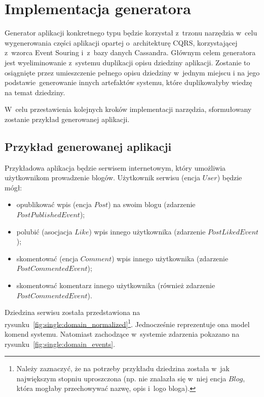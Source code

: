 \chapter{Implementacja generatora} \label{chap:implementation:single_type}

Generator aplikacji konkretnego typu będzie korzystał z~trzonu narzędzia w~celu wygenerowania części aplikacji opartej o~architekturę CQRS, korzystającej z~wzorca Event Souring i~z~bazy danych Cassandra.
Głównym celem generatora jest wyeliminowanie z~systemu duplikacji opisu dziedziny aplikacji.
Zostanie to osiągnięte przez umieszczenie pełnego opisu dziedziny w~jednym miejscu i na jego podstawie~generowanie innych artefaktów systemu, które duplikowałyby wiedzę na temat dziedziny.

W~celu przestawienia kolejnych kroków implementacji narzędzia, sformułowany zostanie przykład generowanej aplikacji.



\section{Przykład generowanej aplikacji}

Przykładowa aplikacja będzie serwisem internetowym, który umożliwia użytkownikom prowadzenie blogów.
Użytkownik serwisu (encja $User$) będzie mógł:

\begin{itemize}
 \item opublikować wpis (encja $Post$) na swoim blogu (zdarzenie $PostPublishedEvent$);
 \item polubić (asocjacja $Like$) wpis innego użytkownika (zdarzenie $PostLikedEvent$);
 \item skomentować (encja $Comment$) wpis innego użytkownika (zdarzenie $PostCommentedEvent$);
 \item skomentować komentarz innego użytkownika (również zdarzenie $PostCommentedEvent$).
\end{itemize}

Dziedzina serwisu została przedstawiona na rysunku~\ref{fig:single:domain_normalized}\footnote{Należy zaznaczyć, że na potrzeby przykładu dziedzina została w~jak największym stopniu uproszczona (np. nie znalazła się w~niej encja $Blog$, która mogłaby przechowywać nazwę, opis i~logo bloga).}.
Jednocześnie reprezentuje ona model komend systemu.
Natomiast zachodzące w~systemie zdarzenia pokazano na rysunku~\ref{fig:single:domain_events}.

